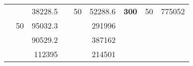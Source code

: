 \begin{table}[H]
\begin{tabular}{|ccrccrccc}
\rowcolor[HTML]{DDFDFF} 
\multicolumn{1}{|c|}{\cellcolor[HTML]{FFFFC7}}                                & \multicolumn{1}{c|}{\cellcolor[HTML]{DDFDFF}}                      & \multicolumn{1}{r|}{\cellcolor[HTML]{DAE8FC}38228.5}   & \multicolumn{1}{c|}{\cellcolor[HTML]{FFFFC7}}                                & \multicolumn{1}{c|}{\multirow{-10}{*}{\cellcolor[HTML]{DDFDFF}50}}  & \multicolumn{1}{r|}{\cellcolor[HTML]{DDFDFF}52288.6}   & \multicolumn{1}{c|}{\multirow{-19}{*}{\cellcolor[HTML]{FFFFC7}\textbf{300}}} & \multicolumn{1}{c|}{\multirow{-10}{*}{\cellcolor[HTML]{DDFDFF}50}} & \multicolumn{1}{r|}{\cellcolor[HTML]{DDFDFF}775052}    \\ \cline{3-3} \cline{5-9} 
\multicolumn{1}{|c|}{\cellcolor[HTML]{FFFFC7}}                                & \multicolumn{1}{c|}{\multirow{-10}{*}{\cellcolor[HTML]{DDFDFF}50}} & \multicolumn{1}{r|}{\cellcolor[HTML]{DDFDFF}95032.3}   & \multicolumn{1}{c|}{\cellcolor[HTML]{FFFFC7}}                                & \multicolumn{1}{c|}{\cellcolor[HTML]{DAE8FC}}                       & \multicolumn{1}{r|}{\cellcolor[HTML]{DAE8FC}291996}    &                                                                              &                                                                    &                                                        \\ \cline{2-3} \cline{6-6}
\multicolumn{1}{|c|}{\cellcolor[HTML]{FFFFC7}}                                & \multicolumn{1}{c|}{\cellcolor[HTML]{DAE8FC}}                      & \multicolumn{1}{r|}{\cellcolor[HTML]{DAE8FC}90529.2}   & \multicolumn{1}{c|}{\cellcolor[HTML]{FFFFC7}}                                & \multicolumn{1}{c|}{\cellcolor[HTML]{DAE8FC}}                       & \multicolumn{1}{r|}{\cellcolor[HTML]{DDFDFF}387162}    &                                                                              &                                                                    &                                                        \\ \cline{3-3} \cline{6-6}
\multicolumn{1}{|c|}{\cellcolor[HTML]{FFFFC7}}                                & \multicolumn{1}{c|}{\cellcolor[HTML]{DAE8FC}}                      & \multicolumn{1}{r|}{\cellcolor[HTML]{DDFDFF}112395}    & \multicolumn{1}{c|}{\cellcolor[HTML]{FFFFC7}}                                & \multicolumn{1}{c|}{\cellcolor[HTML]{DAE8FC}}                       & \multicolumn{1}{r|}{\cellcolor[HTML]{DAE8FC}214501}    &                                                                              &                                                                    &                                                        \\ \cline{3-3} \cline{6-6}

\end{tabular}
\end{table}
